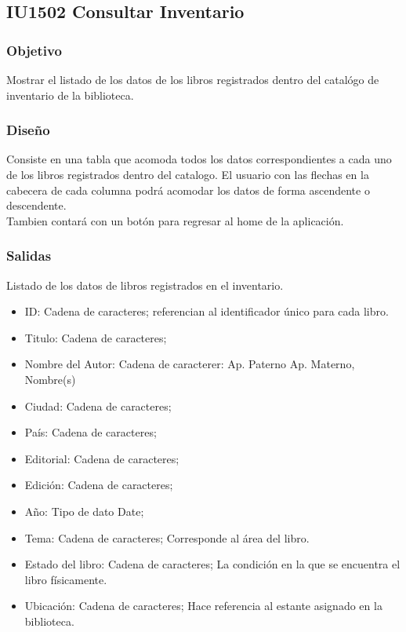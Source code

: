 \newpage
\subsection{IU1502 Consultar Inventario }

\subsubsection{Objetivo}
	Mostrar el listado de los datos de los libros registrados dentro del catalógo de inventario de la biblioteca. 

\subsubsection{Diseño}
	Consiste en una tabla que acomoda todos los datos correspondientes a cada uno de los libros registrados dentro del catalogo. El usuario con las flechas en la cabecera de cada columna podrá acomodar los datos de forma ascendente o descendente. \\
	Tambien contará con un botón para regresar al home de la aplicación. 


\subsubsection{Salidas}
	Listado de los datos de libros registrados en el inventario. 
			\begin{itemize}
				\item ID: Cadena de caracteres; referencian al identificador único para cada libro. 
				\item Titulo: Cadena de caracteres; 
				\item Nombre del Autor: Cadena de caracterer: Ap. Paterno Ap. Materno, Nombre(s)
				\item Ciudad: Cadena de caracteres; 
				\item País: Cadena de caracteres; 
				\item Editorial: Cadena de caracteres; 
				\item Edición: Cadena de caracteres; 
				\item Año: Tipo de dato Date;
				\item Tema: Cadena de caracteres; Corresponde al área del libro. 
				\item Estado del libro: Cadena de caracteres; La condición en la que se encuentra el libro físicamente. 
				\item Ubicación:  Cadena de caracteres; Hace referencia al estante asignado en la biblioteca. 
			\end{itemize}		
	
